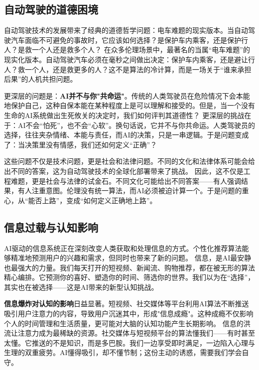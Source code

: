 \subsection{自动驾驶的道德困境}

自动驾驶技术的发展带来了经典的道德哲学问题：电车难题的现实版本。当自动驾驶汽车面临不可避免的事故时，它应该如何选择？是保护车内乘客，还是保护行人？是救一个人还是救多个人？
在众多伦理场景中，最著名的当属“电车难题”的现实化版本。自动驾驶汽车必须在毫秒之间做出决定：保护车内乘客，还是避让行人？救一个人，还是救更多的人？这不是算法的冷计算，而是一场关于“谁来承担后果”的人机共担问题。

更深层的问题是：{\bf AI并不与你"共命运"}。传统的人类驾驶员在危险情况下会本能地保护自己，这种自保本能在某种程度上是可以理解和接受的。但是，当一个没有生命的AI系统做出生死攸关的决定时，我们如何评判其道德性？
更深层的挑战在于：AI不会“怕死”，也不会“心软”。换句话说，它并不与你共命运。人类驾驶员的选择，往往夹杂情绪、本能与责任，而AI的决策，只是一串逻辑。于是问题变成了：当决策里没有情感，我们还如何定义“正确”？

这些问题不仅是技术问题，更是社会和法律问题。不同的文化和法律体系可能会给出不同的答案，这为自动驾驶技术的全球化部署带来了挑战。
因此，这不仅是工程难题，更是社会与法律的试金石。不同文化可能给出不同答案——有人强调结果，有人注重意图。伦理没有统一算法，而AI必须被迫计算一个。于是问题的重心，从“能否上路”，变成“如何定义正确地上路”。

\subsection{信息过载与认知影响}

AI驱动的信息系统正在深刻改变人类获取和处理信息的方式。个性化推荐算法能够精准地预测用户的兴趣和需求，但同时也带来了新的问题。
信息，是AI最安静也最强大的力量。我们每天打开的短视频、新闻流、购物推荐，都在被无形的算法精心编排。它预测你的喜好、塑造你的时间、筛选你的世界。我们以为在“选择”，其实也在被选择——这是AI带来的新型认知挑战。

{\bf 信息爆炸对认知的影响}日益显著。短视频、社交媒体等平台利用AI算法不断推送吸引用户注意力的内容，导致用户沉迷其中，形成"信息成瘾"。这种成瘾不仅影响个人的时间管理和生活质量，更可能对大脑的认知功能产生长期影响。
信息的洪流让注意力成为最稀缺的资源。社交媒体与短视频平台的算法懂我们——有时甚至太懂。它推送的不是知识，而是多巴胺。我们一边享受即时满足，一边陷入心理与生理的双重疲劳。AI懂得吸引，却不懂节制；这份主动的诱惑，需要我们学会自守。

